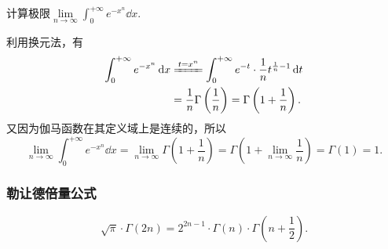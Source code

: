 \begin{example}
\def\l{\lim\limits_{n\to\infty}}%
计算极限\(\l\int_0^{+\infty} e^{-x^n} \dd{x}\).
\begin{solution}
利用换元法，有\begin{align*}
	\int_0^{+\infty} e^{-x^n} \dd{x}
	&\xlongequal{t=x^n}
	\int_0^{+\infty} e^{-t} \cdot \frac{1}{n} t^{\frac{1}{n}-1} \dd{t} \\
	&= \frac{1}{n} \Gamma\left(\frac{1}{n}\right)
	= \Gamma\left(1+\frac{1}{n}\right).
\end{align*}
又因为伽马函数在其定义域上是连续的，所以\[
	\l\int_0^{+\infty} e^{-x^n} \dd{x}
	= \l\Gamma\left(1+\frac{1}{n}\right)
	= \Gamma\left(1+\l\frac{1}{n}\right)
	= \Gamma(1) = 1.
\]
\end{solution}
\end{example}

\subsubsection{勒让德倍量公式}
\begin{theorem}[勒让德倍量公式]
\begin{equation}\label{equation:定积分.勒让德倍量公式}
\sqrt{\pi} \cdot \Gamma(2n)
= 2^{2n-1} \cdot \Gamma(n) \cdot \Gamma\left(n+\frac{1}{2}\right).
\end{equation}
\end{theorem}


